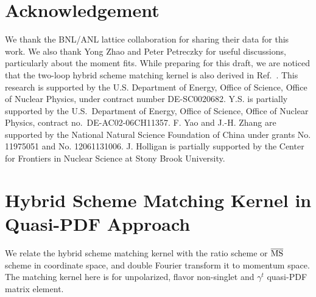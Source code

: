 \documentclass[prd,aps,twocolumn,preprintnumbers, showpacs, nofootinbib,superscriptaddress,notitlepage]{revtex4-2}
\begin{document}

\section*{Acknowledgement}
We thank the BNL/ANL lattice collaboration for sharing their data for this work. We also thank Yong Zhao and Peter Petreczky for useful discussions, particularly about the
moment fits. While preparing for this draft, we are noticed that the two-loop hybrid scheme matching kernel is also derived in Ref.~\cite{Zhao:2022xxx}. This research is supported by the U.S. Department of Energy, Office of Science, Office of Nuclear Physics, under contract number DE-SC0020682. Y.S. is partially supported by the U.S.~Department of Energy, Office of Science, Office of Nuclear Physics, contract no.~DE-AC02-06CH11357. F. Yao and J.-H. Zhang are supported by the National Natural Science Foundation of China under grants No. 11975051 and No. 12061131006. J. Holligan is partially supported by the Center for Frontiers in Nuclear Science at Stony Brook University.

\onecolumngrid
\appendix
\section{Hybrid Scheme Matching Kernel in Quasi-PDF Approach}\label{app:hybridkernel}
We relate the hybrid scheme matching kernel with the ratio scheme or $\overline{\rm MS}$ scheme in coordinate space, and double Fourier transform it to momentum space. The matching kernel here is for unpolarized, flavor non-singlet and $\gamma^{t}$ quasi-PDF matrix element.
\end{document}
